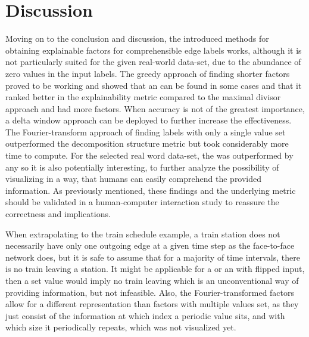 
\chapter{Discussion}
\label{ch:Discussion}
Moving on to the conclusion and discussion, the introduced methods for obtaining explainable factors for comprehensible edge labels works, although it is not particularly suited for the given real-world data-set, due to the abundance of zero values in the input labels.
The greedy approach of finding shorter factors proved to be working and showed that an \orDecomp can be found in some cases and that it ranked better in the explainability metric compared to the maximal divisor approach and had more factors.
When accuracy is not of the greatest importance, a delta window approach can be deployed to further increase the effectiveness.
The Fourier-transform approach of finding labels with only a single value set outperformed the decomposition structure metric but took considerably more time to compute.
For the selected real word data-set, the \orDecomp was outperformed by any \andDecomp so it is also potentially interesting, to further analyze the possibility of visualizing \andDecomp in a way, that humans can easily comprehend the provided information.
As previously mentioned, these findings and the underlying metric should be validated in a human-computer interaction study to reassure the correctness and implications. 

When extrapolating to the train schedule example, a train station does not necessarily have only one outgoing edge at a given time step as the face-to-face network does, but it is safe to assume that for a majority of time intervals, there is no train leaving a station.
It might be applicable for a \andDecomp or an \orDecomp with flipped input, then a set value would imply no train leaving which is an unconventional way of providing information, but not infeasible.
Also, the Fourier-transformed factors allow for a different representation than factors with multiple values set, as they just consist of the information at which index a periodic value sits, and with which size it periodically repeats, which was not visualized yet.


